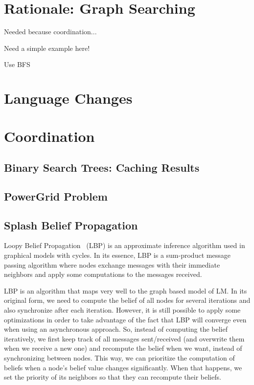 \section{Rationale: Graph Searching}

Needed because coordination...

Need a simple example here!

Use BFS

\section{Language Changes}

\section{Coordination}

\subsection{Binary Search Trees: Caching Results}

\subsection{PowerGrid Problem}

\subsection{Splash Belief Propagation}

Loopy Belief Propagation~\cite{Murphy99loopybelief} (LBP) is an approximate inference algorithm
used in graphical models with cycles. In its essence, LBP is a sum-product message passing algorithm
where nodes exchange messages with their immediate neighbors and apply some computations to the messages
received.

LBP is an algorithm that maps very well to the graph based model of LM. In its original form, we need to compute
the belief of all nodes for several iterations and also synchronize after each iteration.
However, it is still possible to apply
some optimizations in order to take advantage of the fact that LBP will converge even when using
an asynchronous approach. So, instead of computing the belief iteratively,
we first keep track of all messages sent/received (and overwrite them when we receive a new one)
and recompute the belief when we want, instead of synchronizing between nodes.
This way, we can prioritize the computation of beliefs when
a node's belief value changes significantly. When that happens, we set the priority of its
neighbors so that they can recompute their beliefs.

